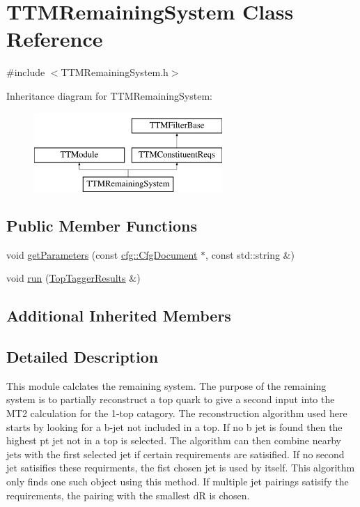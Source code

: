 \hypertarget{classTTMRemainingSystem}{\section{T\-T\-M\-Remaining\-System Class Reference}
\label{classTTMRemainingSystem}
}


{\ttfamily \#include $<$T\-T\-M\-Remaining\-System.\-h$>$}

Inheritance diagram for T\-T\-M\-Remaining\-System\-:\begin{figure}[H]
\begin{center}
\leavevmode
\includegraphics[height=3.000000cm]{classTTMRemainingSystem}
\end{center}
\end{figure}
\subsection*{Public Member Functions}
\begin{DoxyCompactItemize}
\item 
void \hyperlink{classTTMRemainingSystem_a4d72b9607c336e2de3d2f7876c89f5db}{get\-Parameters} (const \hyperlink{classcfg_1_1CfgDocument}{cfg\-::\-Cfg\-Document} $\ast$, const std\-::string \&)
\item 
void \hyperlink{classTTMRemainingSystem_ab9f2abe56c30f34c2319f752c403fb09}{run} (\hyperlink{classTopTaggerResults}{Top\-Tagger\-Results} \&)
\end{DoxyCompactItemize}
\subsection*{Additional Inherited Members}


\subsection{Detailed Description}
This module calclates the remaining system. The purpose of the remaining system is to partially reconstruct a top quark to give a second input into the M\-T2 calculation for the 1-\/top catagory. The reconstruction algorithm used here starts by looking for a b-\/jet not included in a top. If no b jet is found then the highest pt jet not in a top is selected. The algorithm can then combine nearby jets with the first selected jet if certain requirements are satisified. If no second jet satisifies these requirments, the fist chosen jet is used by itself. This algorithm only finds one such object using this method. If multiple jet pairings satisify the requirements, the pairing with the smallest d\-R is chosen.


